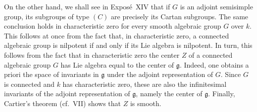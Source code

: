 \begin{enumerate}
  On the other hand, we shall see in Exposé~XIV that if \(G\) is an
  adjoint semisimple group, its subgroups of type \((C)\) are precisely
  its Cartan subgroups. The same conclusion holds in characteristic
  zero for every smooth algebraic group \(G\) over \(k\). This follows
  at once from the fact that, in characteristic zero, a connected
  algebraic group is nilpotent if and only if its Lie algebra is
  nilpotent. In turn, this follows from the fact that in
  characteristic zero the center \(Z\) of a connected algebraic group
  \(G\) has Lie algebra equal to the center of \(\mathfrak g\).
  Indeed, one obtains a priori the space of invariants in
  \(\mathfrak g\) under the adjoint representation of \(G\). Since
  \(G\) is connected and \(k\) has characteristic zero, these are also
  the infinitesimal invariants of the adjoint representation of
  \(\mathfrak g\), namely the center of \(\mathfrak g\). Finally,
  Cartier's theorem (cf.\ VII) shows that \(Z\)
  is smooth.
\end{enumerate}
